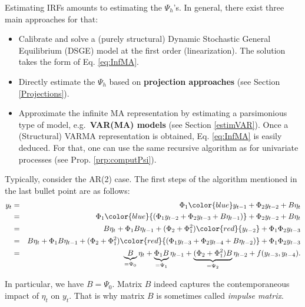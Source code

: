 \documentclass[
  12pt,
]{book}
\providecommand{\tightlist}{%
  \setlength{\itemsep}{0pt}\setlength{\parskip}{0pt}}
\theoremstyle{definition}
\theoremstyle{definition}
\theoremstyle{definition}
\theoremstyle{definition}
\theoremstyle{remark}
\begin{document}
Estimating IRFs amounts to estimating the \(\Psi_{h}\)'s. In general, there exist three main approaches for that:

\begin{itemize}
\tightlist
\item
  Calibrate and solve a (purely structural) Dynamic Stochastic General Equilibrium (DSGE) model at the first order (linearization). The solution takes the form of Eq. \eqref{eq:InfMA}.
\item
  Directly estimate the \(\Psi_{h}\) based on \textbf{projection approaches} (see Section \ref{Projections}).
\item
  Approximate the infinite MA representation by estimating a parsimonious type of model, e.g.~\textbf{VAR(MA) models} (see Section \ref{estimVAR}). Once a (Structural) VARMA representation is obtained, Eq. \eqref{eq:InfMA} is easily deduced. For that, one can use the same recursive algorithm as for univariate processes (see Prop. \ref{prp:computPsi}).
\end{itemize}

Typically, consider the AR(2) case. The first steps of the algorithm mentioned in the last bullet point are as follows:
\begin{eqnarray*}
y_t &=& \Phi_1 {\color{blue}y_{t-1}} + \Phi_2 y_{t-2} + B \eta_t  \\
&=& \Phi_1 \color{blue}{(\Phi_1 y_{t-2} + \Phi_2 y_{t-3} + B \eta_{t-1})} + \Phi_2 y_{t-2} + B \eta_t  \\
&=& B \eta_t + \Phi_1 B \eta_{t-1} + (\Phi_2 + \Phi_1^2) \color{red}{y_{t-2}} + \Phi_1\Phi_2 y_{t-3}  \\
&=& B \eta_t + \Phi_1 B \eta_{t-1} + (\Phi_2 + \Phi_1^2) \color{red}{(\Phi_1 y_{t-3} + \Phi_2 y_{t-4} + B \eta_{t-2})} + \Phi_1\Phi_2 y_{t-3} \\
&=& \underbrace{B}_{=\Psi_0} \eta_t + \underbrace{\Phi_1 B}_{=\Psi_1} \eta_{t-1} + \underbrace{(\Phi_2 + \Phi_1^2)B}_{=\Psi_2} \eta_{t-2} + f(y_{t-3},y_{t-4}).
\end{eqnarray*}

In particular, we have \(B = \Psi_0\). Matrix \(B\) indeed captures the contemporaneous impact of \(\eta_t\) on \(y_t\). That is why matrix \(B\) is sometimes called \emph{impulse matrix}.
\end{document}
